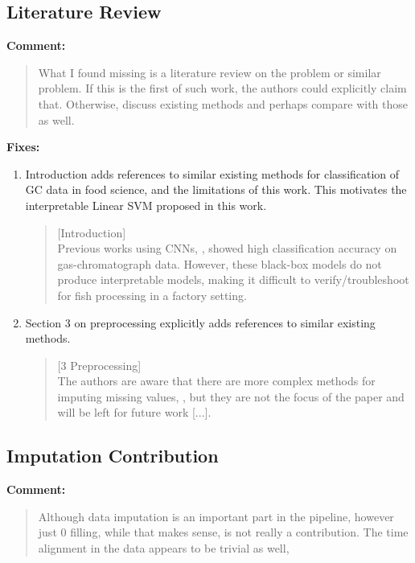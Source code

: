 \documentclass[runningheads]{llncs}
\begin{document}
\subsection{Literature Review}

\textbf{Comment:}

\begin{quote}
  What I found missing is a literature review on the problem or similar problem. If this is the first of such work, the authors could explicitly claim that. Otherwise, discuss existing methods and perhaps compare with those as well.
\end{quote}

\noindent\textbf{Fixes:}

\begin{enumerate}
  \item Introduction adds references to similar existing methods for classification of GC data in food science, and the limitations of this work. This motivates the interpretable Linear SVM proposed in this work.
  \begin{quote}
    [Introduction] \\ 
    Previous works using CNNs, \emph{\cite{bi2020gc,matyushin2020gas}}, showed high classification accuracy on gas-chromatograph data. 
    However, these black-box models do not produce interpretable models, making it difficult to verify/troubleshoot for fish processing in a factory setting.
  \end{quote}
  \item Section 3 on preprocessing explicitly adds references to similar existing methods.
  \begin{quote}
    [3 Preprocessing] \\ 
    The authors are aware that there are more complex methods for imputing missing values, \emph{\cite{tomasi2004correlation,zhang2008two}}, but they are not the focus of the paper and will be left for future work [...].
  \end{quote}
\end{enumerate}

\subsection{Imputation Contribution}

\textbf{Comment:}

\begin{quote}
  Although data imputation is an important part in the pipeline, however just 0 filling, while that makes sense, is not really a contribution. The time alignment in the data appears to be trivial as well,
\end{quote}
\end{document}
